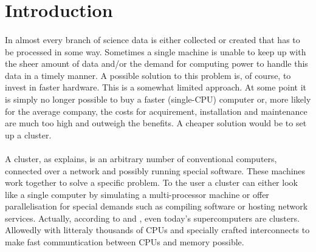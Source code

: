 \section{Introduction}
\paragraph{}
In almost every branch of science data is either collected or created that has to be processed in some way. Sometimes a single machine is unable to keep up with the sheer amount of data and/or the demand for computing power to handle this data in a timely manner. A possible solution to this problem is, of course, to invest in faster hardware. This is a somewhat limited approach. At some point it is simply no longer possible to buy a faster (single-CPU) computer or, more likely for the average company, the costs for acquirement, installation and maintenance are much too high and outweigh the benefits. A cheaper solution would be to set up a cluster.
\paragraph{}
A cluster, as  explains, is an arbitrary number of conventional computers, connected over a network and possibly running special software. These machines work together to solve a specific problem. To the user a cluster can either look like a single computer by simulating a multi-processor machine or offer parallelisation for special demands such as compiling software or hosting network services. Actually, according to  and , even today's supercomputers are clusters. Allowedly with litteraly thousands of CPUs and specially crafted interconnects to make fast communtication between CPUs and memory possible.

